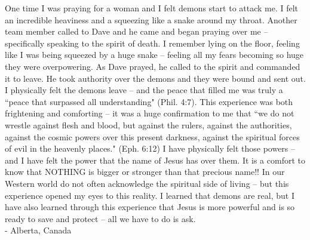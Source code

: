 \documentclass[oneside]{book}
\begin{document}
One time I was praying for a woman and I felt demons start to attack me. I felt an incredible heaviness and a squeezing like a snake around my throat. Another team member called to Dave and he came and began praying over me – specifically speaking to the spirit of death. I remember lying on the floor, feeling like I was being squeezed by a huge snake – feeling all my fears becoming so huge they were overpowering. As Dave prayed, he called to the spirit and commanded it to leave. He took authority over the demons and they were bound and sent out. I physically felt the demons leave – and the peace that filled me was truly a ``peace that surpassed all understanding" (Phil. 4:7).
This experience was both frightening and comforting – it was a huge confirmation to me that ``we do not wrestle against flesh and blood, but against the rulers, against the authorities, against the cosmic powers over this present darkness, against the spiritual forces of evil in the heavenly places." (Eph. 6:12)  I have physically felt those powers – and I have felt the power that the name of Jesus has over them. It is a comfort to know that NOTHING is bigger or stronger than that precious name!!
In our Western world do not often acknowledge the spiritual side of living – but this experience opened my eyes to this reality. I learned that demons are real, but I have also learned through this experience that Jesus is more powerful and is so ready to save and protect – all we have to do is ask. \\

- Alberta, Canada
\clearpage

\end{document}
